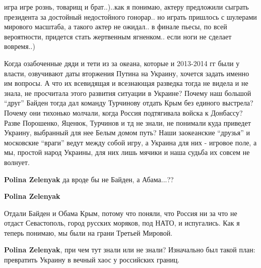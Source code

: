  
 
 
 
 
\zzSecCmt

\begin{itemize} %

игра игре рознь, товарищ и брат..)..как я понимаю, актеру предложили сыграть
президента за достойный недостойного гонорар.. но играть пришлось с шулерами
мирового масштаба, а такого актер не ожидал.. в финале пьесы, по всей
вероятности, придется стать жертвенным ягненком.. если ноги не сделает
вовремя..)



Когда озабоченные дяди и тети из за океана, которые и 2013-2014 гг были у
власти, озвучивают даты вторжения Путина на Украину, хочется задать именно им
вопросы. А что их всевидящая и всезнающая разведка тогда не видела и не знала,
не просчитала этого развития ситуации в Украине? Почему наш большой
\enquote{друг} Байден тогда дал команду Турчинову отдать Крым без единого
выстрела? Почему они тихонько молчали, когда Россия подтягивала войска к
Донбассу? Разве Порошенко, Яценюк, Турчинов и тд не знали, не понимали куда
приведет Украину, выбранный для нее Белым домом путь? Наши заокеанские
\enquote{друзья} и московские \enquote{враги} ведут между собой игру, а Украина
для них - игровое поле, а мы, простой народ Украины, для них лишь мячики и наша
судьба их совсем не волнует.

\begin{itemize} %
\textbf{Polina Zelenyak} да вроде бы не Байден, а Абама...??

\textbf{Polina Zelenyak} 

Отдали Байден и Обама Крым, потому что поняли, что Россия ни за что не отдаст
Севастополь, город русских моряков, под НАТО, и испугались. Как я теперь
понимаю, мы были на грани Третьей Мировой.

\textbf{Polina Zelenyak}, при чем тут знали или не знали? Изначально был такой план: превратить Украину в вечный хаос у российских границ.



\end{itemize}
\end{itemize}
